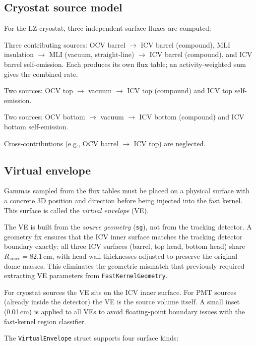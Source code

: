 \documentclass[11pt]{article}
\begin{document}
\subsection{Cryostat source model}

For the LZ cryostat, three independent surface fluxes are computed:

\begin{description}[leftmargin=2.0cm,style=nextline]
\item[Barrel] Three contributing sources: OCV barrel $\to$ ICV
barrel (compound), MLI insulation $\to$ MLI (vacuum, straight-line) $\to$ ICV
barrel (compound), and ICV barrel self-emission. Each produces its own flux
table; an activity-weighted sum gives the combined rate.
\item[Top head] Two sources: OCV top $\to$ vacuum $\to$ ICV top (compound) and
ICV top self-emission.
\item[Bottom head] Two sources: OCV bottom $\to$ vacuum $\to$ ICV bottom
(compound) and ICV bottom self-emission.
\end{description}

Cross-contributions (e.g., OCV barrel $\to$ ICV top) are neglected.

\subsection{Virtual envelope}

Gammas sampled from the flux tables must be placed on a physical surface with a
concrete 3D position and direction before being injected into the fast kernel.
This surface is called the \emph{virtual envelope} (VE).

The VE is built from the \emph{source geometry} (\texttt{sg}), not from the
tracking detector. A geometry fix ensures that the ICV inner surface matches
the tracking detector boundary exactly: all three ICV surfaces (barrel, top
head, bottom head) share $R_{\text{inner}} = 82.1$\,cm, with head wall
thicknesses adjusted to preserve the original dome masses. This eliminates the
geometric mismatch that previously required extracting VE parameters from
\texttt{FastKernelGeometry}.

For cryostat sources the VE sits on the ICV inner surface. For PMT sources
(already inside the detector) the VE is the source volume itself. A small
inset (0.01\,cm) is applied to all VEs to avoid floating-point boundary issues
with the fast-kernel region classifier.

The \texttt{VirtualEnvelope} struct supports four surface kinds:
\end{document}
